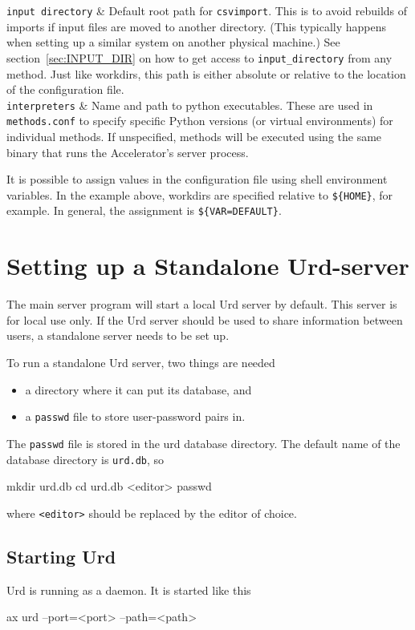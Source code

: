 \RPtwo \texttt{input directory} & Default root path for
\texttt{csvimport}.  This is to avoid rebuilds of imports if input
files are moved to another directory.  (This typically happens when
setting up a similar system on another physical machine.)  See
section~\ref{sec:INPUT_DIR} on how to get access to
\texttt{input\_directory} from any method.  Just like workdirs, this
path is either absolute or relative to the location of the
configuration file.  \\[1ex]

\RPtwo \texttt{interpreters} & Name and path to python executables.
These are used in \texttt{methods.conf} to specify specific Python
versions (or virtual environments) for individual methods.  If
unspecified, methods will be executed using the same binary that runs
the Accelerator's server process.\\[1ex]

\stoptabletwo

It is possible to assign values in the configuration file using shell
environment variables.  In the example above, workdirs are specified
relative to \texttt{\$\{HOME\}}, for example.  In general, the
assignment is \texttt{\$\{VAR=DEFAULT\}}.



\section{Setting up a Standalone Urd-server}
\label{sec:urd_setup}
The main server program will start a local Urd server by default.
This server is for local use only.  If the Urd server should be used
to share information between users, a standalone server needs to be
set up.

To run a standalone Urd server, two things are needed
\begin{itemize}
\item[] a directory where it can put its database, and
\item[] a \texttt{passwd} file to store user-password pairs in.
\end{itemize}
The \texttt{passwd} file is stored in the urd database directory.  The
default name of the database directory is \texttt{urd.db}, so
\begin{shell}
mkdir urd.db
cd urd.db
<editor> passwd
\end{shell}
where \texttt{<editor>} should be replaced by the editor of choice.


\subsection{Starting Urd}
Urd is running as a daemon.  It is started like this
\begin{shell}
ax urd --port=<port> --path=<path>
\end{shell}



